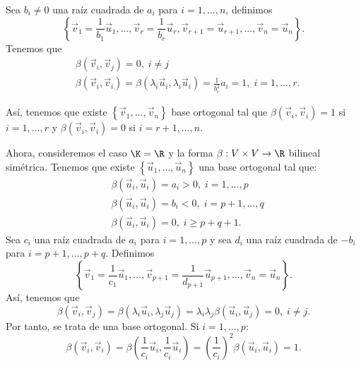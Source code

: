 Sea $\displaystyle b_{i} \neq 0 $ una raíz cuadrada de $\displaystyle a_{i} $ para $\displaystyle i = 1, \ldots, n $, definimos
\[ \left\{ \vec{v}_{1} = \frac{1}{b_{1}}\vec{u}_{1}, \ldots, \vec{v}_{r} = \frac{1}{b_{r}}\vec{u}_{r}, \vec{v}_{r+1} = \vec{u}_{r+1}, \ldots, \vec{v}_{n} = \vec{u}_{n} \right\}  .\]
Tenemos que 
\[
\begin{split}
&\beta\left(\vec{v}_{i}, \vec{v}_{j}\right) = 0, \; i \neq j \\
&\beta\left(\vec{v}_{i}, \vec{v}_{i}\right) = \beta\left(\lambda_{i}\vec{u}_{i},\lambda_{i}\vec{u}_{i} \right) = \frac{1}{b_{i}^{2}}a_{i} = 1, \; i = 1, \ldots, r.
\end{split}
\]
\begin{observation}
\normalfont Así, tenemos que existe $\displaystyle \left\{ \vec{v}_{1}, \ldots, \vec{v}_{n}\right\}  $ base ortogonal tal que $\displaystyle \beta\left(\vec{v}_{i}, \vec{v}_{i}\right) = 1 $ si $\displaystyle i = 1, \ldots, r $ y $\displaystyle \beta\left(\vec{v}_{i}, \vec{v}_{i}\right)=0 $ si $\displaystyle i = r+1, \ldots, n $.
\end{observation}
Ahora, consideremos el caso $\displaystyle \K = \R $ y la forma $\displaystyle \beta : V \times V \to \R $ bilineal simétrica. Tenemos que existe $\displaystyle \left\{ \vec{u}_{1}, \ldots, \vec{u}_{n}\right\}  $ una base ortogonal tal que:
\[
\begin{split}
& \beta\left(\vec{u}_{i}, \vec{u}_{i}\right) = a_{i} > 0, \; i = 1, \ldots, p \\
& \beta\left(\vec{u}_{i}, \vec{u}_{i}\right) = b_{i} < 0, \; i = p + 1, \ldots, q \\
& \beta\left(\vec{u}_{i}, \vec{u}_{i}\right) = 0, \; i \geq p + q + 1.
\end{split}
\]
Sea $\displaystyle c_{i} $ una raíz cuadrada de $\displaystyle a_{i} $ para $\displaystyle i = 1, \ldots, p $ y sea $\displaystyle d _{i} $ una raíz cuadrada de $\displaystyle - b_{i} $ para $\displaystyle i = p + 1, \ldots, p + q $. Definimos
\[ \left\{ \vec{v}_{1} = \frac{1}{c_{1}}\vec{u}_{1}, \ldots, \vec{v}_{p + 1} = \frac{1}{d _{p+ 1}}\vec{u}_{ p + 1}, \ldots, \vec{v}_{n} = \vec{u}_{n}\right\}  .\]
Así, tenemos que 
\[ \beta\left(\vec{v}_{i}, \vec{v}_{j}\right) = \beta\left(\lambda_{i}\vec{u}_{i}, \lambda_{j}\vec{u}_{j}\right) = \lambda_{i}\lambda_{j}\beta\left(\vec{u}_{i}, \vec{u}_{j}\right) = 0, \; i \neq j .\]
Por tanto, se trata de una base ortogonal. Si $\displaystyle i = 1, \ldots, p $:
\[\beta\left(\vec{v}_{i},\vec{v}_{i}\right) = \beta\left(\frac{1}{c_{i}}\vec{u}_{i}, \frac{1}{c_{i}}\vec{u}_{i}\right) = \left(\frac{1}{c_{i}}\right)^{2}\beta\left(\vec{u}_{i}, \vec{u}_{i}\right) = 1 .\]
